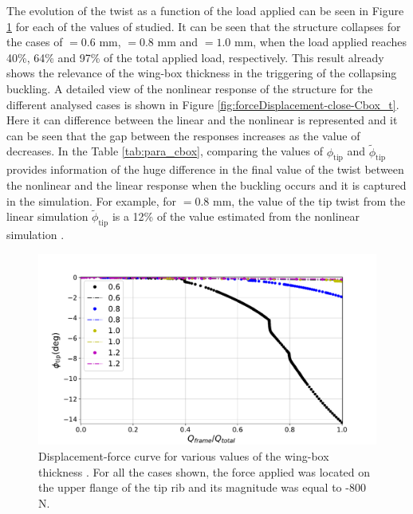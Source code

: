     The evolution of the twist as a function of the load applied can be seen in Figure \ref{fig:forceDisplacement-far-Cbox_t} for each of the values of \boxt studied. It can be seen that the structure collapses for the cases of \boxt$= 0.6$ mm, \boxt$= 0.8$ mm and \boxt$= 1.0$ mm, when the load applied reaches 40\%, 64\% and 97\% of the total applied load, respectively. This result already shows the relevance of the wing-box thickness \boxt in the triggering of the collapsing buckling. A detailed view of the nonlinear response of the structure for the different analysed cases is shown in Figure \ref{fig:forceDisplacement-close-Cbox_t}. Here it can difference between the linear and the nonlinear is represented and it can be seen that the gap between the responses increases as the value of \boxt decreases. In the Table \ref{tab:para_cbox}, comparing the values of $\phi_{\mathrm{tip}}$ and $\tilde{\phi}_{\mathrm{tip}}$ provides information of the huge difference in the final value of the twist between the nonlinear and the linear response when the buckling occurs and it is captured in the simulation. For example, for \boxt$= 0.8$ mm, the value of the tip twist from the linear simulation $\tilde{\phi}_{\mathrm{tip}}$ is a 12\% of the value estimated from the nonlinear simulation \phinonlin.

    \begin{figure}[!htpb] %
      \centering
      \includegraphics[width=0.8 \textwidth]{../figures/result-sim/cbox/force_displacement-far}
      \caption[Displacement-force curve for various values of the wing-box thickness]{Displacement-force curve for various values of the wing-box thickness \boxt. For all the cases shown, the force applied was located on the upper flange of the tip rib and its magnitude was equal to -800 N.}\label{fig:forceDisplacement-far-Cbox_t}
    \end{figure}

